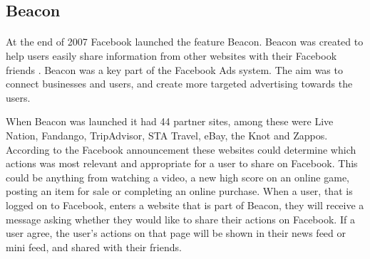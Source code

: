 




\subsection{Beacon}
\paragraph{}
At the end of 2007 Facebook launched the feature Beacon. Beacon was created to help users easily share information from other websites with their Facebook friends \cite{BeaconWebsites}. Beacon was a key part of the Facebook Ads system. The aim was to connect businesses and users, and create more targeted advertising towards the users. 

When Beacon was launched it had 44 partner sites, among these were Live Nation, Fandango, TripAdvisor, STA Travel, eBay, the Knot and Zappos. According to the Facebook announcement \cite{BeaconWebsites} these websites could determine which actions was most relevant and appropriate for a user to share on Facebook. This could be anything from watching a video, a new high score on an online game, posting an item for sale or completing an online purchase. When a user, that is logged on to Facebook, enters a website that is part of Beacon, they will receive a message asking whether they would like to share their actions on Facebook. If a user agree, the user's actions on that page will be shown in their news feed or mini feed, and shared with their friends.  

